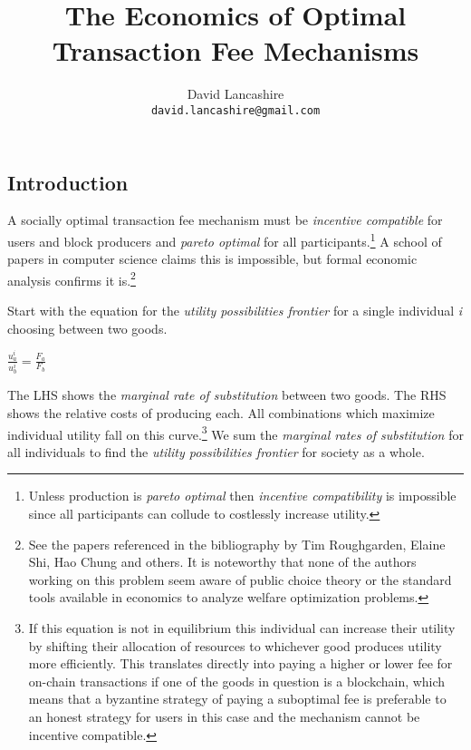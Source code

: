 \documentclass[oneside]{article}   	%
\title{The Economics of Optimal Transaction Fee Mechanisms}
\author{
  David Lancashire\\
  \texttt{david.lancashire@gmail.com}\\
}
\begin{document}
\maketitle


\subsection*{Introduction}

A socially optimal transaction fee mechanism must be \textit{incentive compatible} for users and block producers and \textit{pareto optimal} for all participants.\footnote{Unless production is \textit{pareto optimal} then \textit{incentive compatibility} is impossible since all participants can collude to costlessly increase utility.} A school of papers in computer science claims this is impossible, but formal economic analysis confirms it is.\footnote{See the papers referenced in the bibliography by Tim Roughgarden, Elaine Shi, Hao Chung and others. It is noteworthy that none of the authors working on this problem seem aware of public choice theory or the standard tools available in economics to analyze welfare optimization problems.}

Start with the equation for the \textit{utility possibilities frontier} for a single individual \textit{i} choosing between two goods.

\LARGE
\begin{adjustwidth}{1.5em}{1.5em} 
\begin{math}
\frac{u_a^i}{u_b^i} = \frac{F_a}{F_b}
\end{math}
\end{adjustwidth}
\normalsize

The LHS shows the \textit{marginal rate of substitution} between two goods. The RHS shows the relative costs of producing each. All combinations which maximize individual utility fall on this curve.\footnote{If this equation is not in equilibrium this individual can increase their utility by shifting their allocation of resources to whichever good produces utility more efficiently. This translates directly into paying a higher or lower fee for on-chain transactions if one of the goods in question is a blockchain, which means that a byzantine strategy of paying a suboptimal fee is preferable to an honest strategy for users in this case and the mechanism cannot be incentive compatible.} We sum the \textit{marginal rates of substitution} for all individuals to find the \textit{utility possibilities frontier} for society as a whole.
\end{document}
